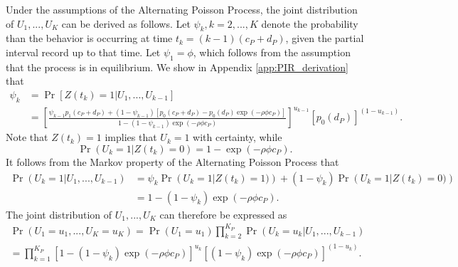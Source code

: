 \documentclass[man, noextraspace, floatsintext]{apa6}\usepackage[]{graphicx}\usepackage[]{color}
\begin{document}
Under the assumptions of the Alternating Poisson Process, the joint distribution of $U_1,...,U_K$ can be derived as follows. 
Let $\psi_k, k = 2,...,K$ denote the probability than the behavior is occurring at time $t_k = (k-1)(c_P + d_P)$, given the partial interval record up to that time. 
Let $\psi_1 = \phi$, which follows from the assumption that the process is in equilibrium. We show in Appendix \ref{app:PIR_derivation} that  
\begin{equation}
\label{eq:psi_k}
\begin{aligned}
\psi_k &= \Pr\left[ Z(t_k) = 1 \left| U_1,...,U_{k-1}\right.\right] \\
 &= \left[\frac{\psi_{k-1} p_1(c_P + d_P) + (1 - \psi_{k-1}) \left[p_0(c_P + d_P) - p_0(d_P) \exp\left(- \rho \phi c_P\right)\right]}{1 - (1 - \psi_{k-1})\exp\left( - \rho \phi c_P \right)}\right]^{u_{k-1}} \left[p_0(d_P)\right]^{(1 - u_{k-1})}.
\end{aligned}
\end{equation}
Note that $Z(t_k) = 1$ implies that $U_k = 1$ with certainty, while 
\[ \Pr\left(U_k = 1\left| Z(t_k) = 0\right.\right) = 1 - \exp\left(- \rho \phi c_P\right).\]
It follows from the Markov property of the Alternating Poisson Process that 
\begin{align*}
\Pr\left(U_k = 1 \left| U_1,...,U_{k-1}\right.\right) &= \psi_k \Pr\left(U_k = 1 \left| Z(t_k) = 1)\right.\right)  + (1 - \psi_k)\Pr\left(U_k = 1 \left| Z(t_k) = 0)\right.\right) \\
&= 1 - (1 - \psi_k)\exp\left(- \rho \phi c_P\right).
\end{align*}
The joint distribution of $U_1,...,U_K$ can therefore be expressed as 
\begin{multline}
\label{eq:PIR_joint}
\Pr\left(U_1 =u_1,...,U_K = u_K\right) = \Pr\left(U_1=u_1\right) \prod_{k=2}^{K_P}\Pr\left(U_k=u_k \left| U_1,...,U_{k-1}\right.\right)  \\
= \prod_{k=1}^{K_P} \left[1 - (1 - \psi_k)\exp\left(- \rho \phi c_P\right) \right]^{u_k} \left[(1 - \psi_k)\exp\left(- \rho \phi c_P\right)\right]^{(1 - u_k)}.
\end{multline}
\end{document}
